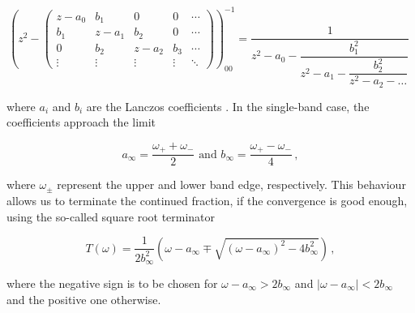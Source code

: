 \documentclass[
    reprint, 
    aps,
    preprintnumbers,
    twocolumn,
    prb,
    superscriptaddress
]{revtex4-2}
\begin{document}
\begin{widetext}
\begin{equation}
    \left( z^2 - \begin{pmatrix}
        z - a_0 & b_1 & 0 & 0 & \cdots \\
        b_1 & z - a_1 & b_2 & 0 & \cdots \\
        0 & b_2 & z - a_2 & b_3 & \cdots \\
        \vdots & \vdots & \vdots & \vdots & \ddots
    \end{pmatrix} \right)_{00}^{-1} = \dfrac{1}{z^2 - a_0 - \dfrac{b_1^2}{z^2 - a_1 - \dfrac{b_2^2}{ z^2 - a_2 - \hdots}}}\,\,
\end{equation}
\end{widetext}

where $a_i$ and $b_i$ are the Lanczos coefficients \cite{PettiforRecursion,ViswanathRecursion}.
In the single-band case, the coefficients approach the limit

\begin{equation}
    \label{eqn:inf_lanczos}
    a_\infty = \frac{\omega_+ + \omega_-}{2}\text{  and  } b_\infty = \frac{\omega_+ - \omega_-}{4}\,,
\end{equation}

where $\omega_\pm$ represent the upper and lower band edge, respectively.
This behaviour allows us to terminate the continued fraction, if the convergence is good enough, using the so-called square root terminator

\begin{equation}
    T(\omega) = \frac{1}{2b_\infty^2} \left( \omega - a_\infty \mp \sqrt{(\omega - a_\infty)^2 - 4 b_\infty^2} \right)\,,
\end{equation}

where the negative sign is to be chosen for $\omega - a_\infty > 2b_\infty$ and $|\omega - a_\infty| < 2b_\infty$ and the positive one otherwise.

\end{document}
